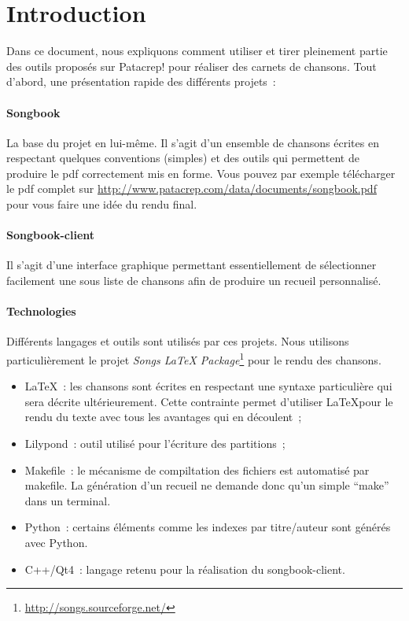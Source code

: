 \documentclass[online]{patacrep}
\begin{document}

\ClearShipoutPicture

\thispagestyle{empty}
\tableofcontents \newpage

\section*{Introduction}

Dans ce document, nous expliquons comment utiliser et tirer pleinement
partie des outils proposés sur Patacrep! pour réaliser des carnets de
chansons. Tout d'abord, une présentation rapide des différents projets~:

\paragraph{Songbook}
La base du projet en lui-même. Il s'agit d'un ensemble de chansons
écrites en respectant quelques conventions (simples) et des outils qui
permettent de produire le pdf correctement mis en forme. Vous pouvez
par exemple télécharger le pdf complet sur
\url{http://www.patacrep.com/data/documents/songbook.pdf} pour
vous faire une idée du rendu final.

\paragraph{Songbook-client} 
Il s'agit d'une interface graphique permettant essentiellement de
sélectionner facilement une sous liste de chansons afin de produire un
recueil personnalisé.

\paragraph{Technologies} 
Différents langages et outils sont utilisés par ces projets.  Nous
utilisons particulièrement le projet \emph{Songs LaTeX
  Package}\footnote{\url{http://songs.sourceforge.net/}} pour le
  rendu des chansons.

\begin{itemize}
\item \LaTeX~: les chansons sont écrites en respectant une syntaxe
  particulière qui sera décrite ultérieurement. Cette contrainte
  permet d'utiliser \LaTeX pour le rendu du texte avec tous les
  avantages qui en découlent~;
\item Lilypond~: outil utilisé pour l'écriture des partitions~;
\item Makefile~: le mécanisme de compiltation des fichiers est
  automatisé par makefile.  La génération d'un recueil ne demande donc
  qu'un simple ``make'' dans un terminal.
\item Python~: certains éléments comme les indexes par titre/auteur
  sont générés avec Python.
\item C++/Qt4~: langage retenu pour la réalisation du songbook-client.
\end{itemize}
\end{document}
